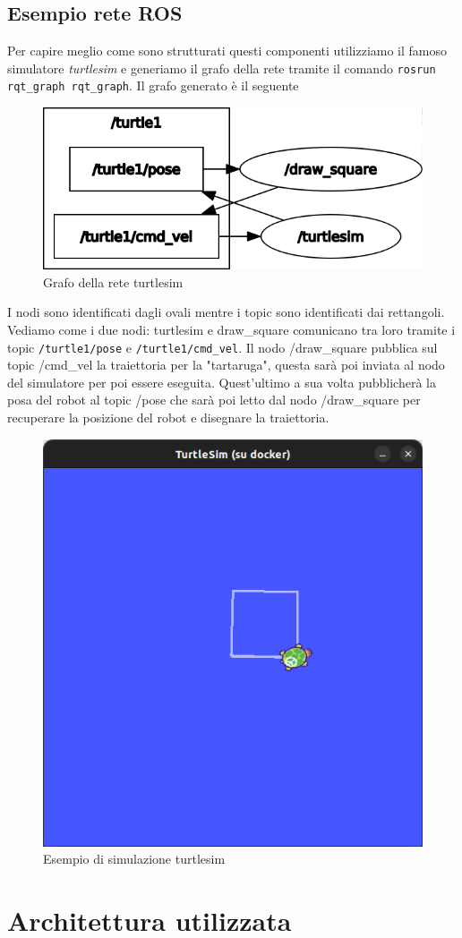 \subsection{Esempio rete ROS}
\label{subsec:esempio_rete_ros}
Per capire meglio come sono strutturati questi componenti utilizziamo il famoso simulatore \textit{turtlesim} e generiamo il grafo della rete tramite il comando \verb+rosrun rqt_graph rqt_graph+. Il grafo generato è il seguente
\begin{figure}[h!]
    \centering
    \includegraphics[scale=0.5]{images/turtlesim.png}
    \caption{Grafo della rete turtlesim}
    \label{fig:turtlesim}
\end{figure}
I nodi sono identificati dagli ovali mentre i topic sono identificati dai rettangoli. Vediamo come i due nodi: turtlesim e draw\_square comunicano tra loro tramite i topic \verb+/turtle1/pose+ e \verb+/turtle1/cmd_vel+. Il nodo /draw\_square pubblica sul topic /cmd\_vel la traiettoria per la "tartaruga", questa sarà poi inviata al nodo del simulatore per poi essere eseguita. Quest'ultimo a sua volta pubblicherà la posa del robot al topic /pose che sarà poi letto dal nodo /draw\_square per recuperare la posizione del robot e disegnare la traiettoria.
\begin{figure}[h!]
    \centering
    \includegraphics[scale=0.4]{images/turtlesimes.png}
    \caption{Esempio di simulazione turtlesim}
    \label{fig:turtlesimes}
\end{figure}
\section{Architettura utilizzata}
\label{sec:architettura_utilizzata}

